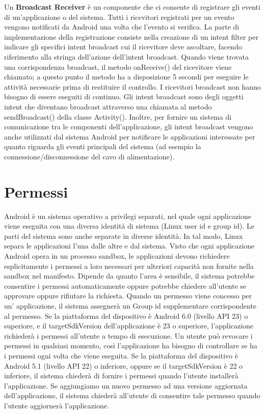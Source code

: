 Un \textbf{Broadcast Receiver} è un componente che ci consente di registrare gli eventi di un'applicazione o del sistema.
Tutti i ricevitori registrati per un evento vengono notificati da Android una volta che l'evento si verifica.
La parte di implementazione della registrazione consiste nella creazione di un intent filter per indicare gli specifici intent broadcast cui il ricevitore deve ascoltare, facendo riferimento alla stringa dell'azione dell'intent broadcast.
Quando viene trovata una corrispondenza broadcast, il metodo onReceive() del ricevitore viene chiamato; a questo punto il metodo ha a disposizione 5 secondi per eseguire le attività necessarie prima di restituire il controllo.
I ricevitori broadcast non hanno bisogno di essere eseguiti di continuo.
Gli intent broadcast sono degli oggetti intent che diventano broadcast attraverso una chiamata al metodo sendBroadcast() della classe Activity().
Inoltre, per fornire un sistema di comunicazione tra le componenti dell'applicazione, gli intent broadcast vengono anche utilizzati dal sistema Android per notificare le applicazioni interessate per quanto riguarda gli eventi principali del sistema (ad esempio la connessione/disconnessione del cavo di alimentazione).

\section{Permessi}
Android è un sistema operativo a privilegi separati, nel quale ogni applicazione viene eseguita con una diversa identità di sistema (Linux user id e group id).
Le parti del sistema sono anche separate in diverse identità.
In tal modo, Linux separa le applicazioni l'una dalle altre e dal sistema.
Visto che ogni applicazione Android opera in un processo sandbox, le applicazioni devono richiedere esplicitamente i permessi a loro necessari per ulteriori capacità non fornite nella sandbox nel manifesto.
Dipende da quanto l'area è sensibile, il sistema potrebbe consentire i permessi automaticamente oppure potrebbe chiedere all'utente se approvare oppure rifiutare la richiesta.
Quando un permesso viene concesso per un' applicazione, il sistema assegnerà un Group id supplementare corrispondente al permesso.
Se la piattaforma del dispositivo è Android 6.0 (livello API 23) o superiore, e il targetSdkVersion dell'applicazione è 23 o superiore, l'applicazione richiederà i permessi all'utente a tempo di esecuzione.
Un utente può revocare i permessi in qualsiasi momento, così l'applicazione ha bisogno di controllare se ha i permessi ogni volta che viene eseguita.
Se la piattaforma del dispositivo è Android 5.1 (livello API 22) o inferiore, oppure se il targetSdkVersion è 22 o inferiore, il sistema chiederà di fornire i permessi quando l'utente installerà l'applicazione.
Se aggiungiamo un nuovo permesso ad una versione aggiornata dell'applicazione, il sistema chiederà all'utente di consentire tale permesso quando l'utente aggiornerà l'applicazione.

